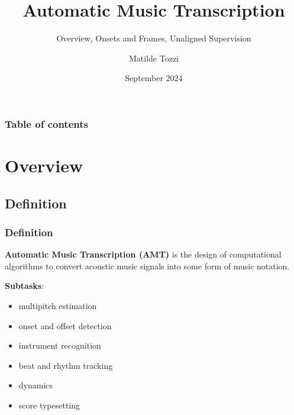 \documentclass{beamer}
\title{Automatic Music Transcription}
\subtitle{Overview, Onsets and Frames, Unaligned Supervision}
\author{Matilde Tozzi}
\institute[]{Ferienakademie 2024}
\date[September 2024]{September 2024}
\newcommand{\emp}[1]{\textcolor{tum}{\textbf{#1}}}
\begin{document}
\beamertemplatenavigationsymbolsempty

\begin{frame}
	\titlepage
\end{frame}

\begin{frame}
	\frametitle{Table of contents}
	\tableofcontents
\end{frame}


\section{Overview}
\subsection{Definition}
\begin{frame}
	\frametitle{Definition}
	\begin{block}{}
		\emp{Automatic Music Transcription (AMT)} is the design of computational algorithms to convert acoustic music signals into some form of music notation. \cite{Overview}
	\end{block}

	\emp{Subtasks}:
	\begin{itemize}
		\item multipitch estimation
		\item onset and offset detection
		\item instrument recognition
		\item beat and rhythm tracking
		\item dynamics
		\item score typesetting
	\end{itemize}
\end{frame}
\end{document}
